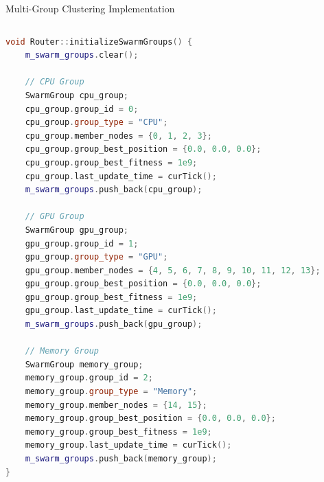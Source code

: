 \documentclass[10pt,aspectratio=169]{beamer}
\begin{document}
\begin{frame}[fragile]{Multi-Group Clustering Implementation}
    \begin{columns}[T]
        \begin{column}{0.48\textwidth}
            \begin{lstlisting}[language=C++,caption=Swarm Group Initialization (Router.cc:587-621)]
void Router::initializeSwarmGroups() {
    m_swarm_groups.clear();
    
    // CPU Group
    SwarmGroup cpu_group;
    cpu_group.group_id = 0;
    cpu_group.group_type = "CPU";
    cpu_group.member_nodes = {0, 1, 2, 3};
    cpu_group.group_best_position = {0.0, 0.0, 0.0};
    cpu_group.group_best_fitness = 1e9;
    cpu_group.last_update_time = curTick();
    m_swarm_groups.push_back(cpu_group);
    
    // GPU Group  
    SwarmGroup gpu_group;
    gpu_group.group_id = 1;
    gpu_group.group_type = "GPU";
    gpu_group.member_nodes = {4, 5, 6, 7, 8, 9, 10, 11, 12, 13};
    gpu_group.group_best_position = {0.0, 0.0, 0.0};
    gpu_group.group_best_fitness = 1e9;
    gpu_group.last_update_time = curTick();
    m_swarm_groups.push_back(gpu_group);
    
    // Memory Group
    SwarmGroup memory_group;
    memory_group.group_id = 2;
    memory_group.group_type = "Memory";
    memory_group.member_nodes = {14, 15};
    memory_group.group_best_position = {0.0, 0.0, 0.0};
    memory_group.group_best_fitness = 1e9;
    memory_group.last_update_time = curTick();
    m_swarm_groups.push_back(memory_group);
}
            \end{lstlisting}
        \end{column}
        
        \begin{column}{0.48\textwidth}
            \begin{figure}
                \centering
\end{figure}
\end{column}
\end{columns}
\end{frame}
\end{document}
